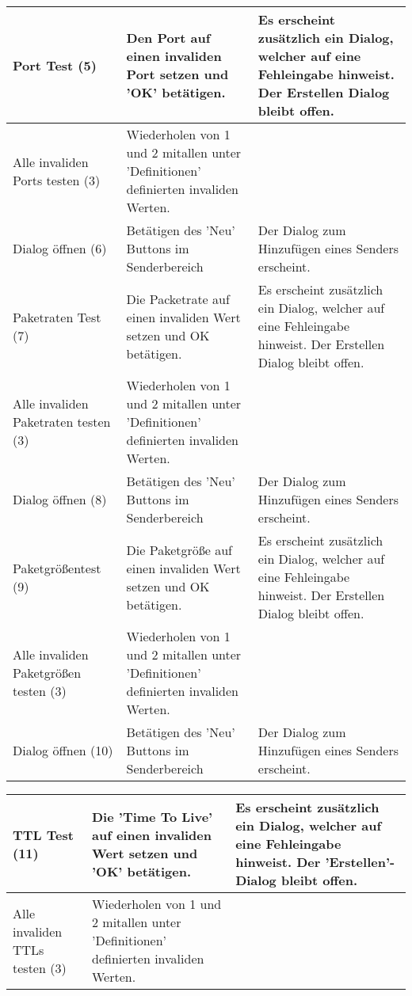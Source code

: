 \begin{table}[h]
\begin{center}
\begin{tabular}{|p{2.5cm}|p{5cm}|p{4.55cm}|}
\hline
Port Test (5) & Den Port auf einen invaliden Port setzen und 'OK'
 betätigen. & Es erscheint zusätzlich ein Dialog, welcher auf eine Fehleingabe
 hinweist. Der Erstellen Dialog bleibt offen.
\\
\hline
Alle invaliden Ports testen (3) & Wiederholen
von 1 und 2 mitallen unter 'Definitionen' definierten invaliden Werten. &
\\
\hline
Dialog öffnen (6) & Betätigen des 'Neu' Buttons im Senderbereich & Der Dialog
 zum Hinzufügen eines Senders erscheint.
\\
\hline
Paketraten Test (7) & Die Packetrate auf einen invaliden Wert setzen und OK
 betätigen. & Es erscheint zusätzlich ein Dialog, welcher auf eine Fehleingabe
 hinweist. Der Erstellen Dialog bleibt offen.
\\
\hline
Alle invaliden Paketraten testen (3) & Wiederholen von 1 und 2 mitallen unter
'Definitionen' definierten invaliden Werten. &
\\
\hline
Dialog öffnen (8) & Betätigen des 'Neu' Buttons im Senderbereich & Der Dialog
 zum Hinzufügen eines Senders erscheint.
\\
\hline
Paketgrößentest (9) & Die Paketgröße auf einen invaliden Wert setzen und OK
 betätigen. &  Es erscheint zusätzlich ein Dialog, welcher auf eine Fehleingabe
 hinweist. Der Erstellen Dialog bleibt offen.
\\
\hline
Alle invaliden Paketgrößen testen (3) & Wiederholen von 1 und 2 mitallen unter
'Definitionen' definierten invaliden Werten. &
\\
\hline
Dialog öffnen (10) & Betätigen des 'Neu' Buttons im Senderbereich & Der Dialog
 zum Hinzufügen eines Senders erscheint.
\\
\hline
\end{tabular}
\end{center}
\end{table}

\begin{table}[h]
\begin{center}
\begin{tabular}{|p{2.5cm}|p{5cm}|p{4.55cm}|}
\hline
TTL Test (11) & Die 'Time To Live' auf einen invaliden Wert setzen und 'OK'
 betätigen. & Es erscheint zusätzlich ein Dialog, welcher auf eine Fehleingabe
 hinweist. Der 'Erstellen'-Dialog bleibt offen.
\\
\hline
Alle invaliden TTLs testen (3) & Wiederholen von 1 und 2 mitallen unter
'Definitionen' definierten invaliden Werten.
\\
\hline
\end{tabular}
\end{center}
\end{table}
